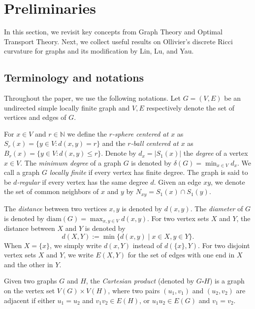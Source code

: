 \documentclass[10pt,a4paper]{article}
\theoremstyle{definition}
\theoremstyle{definition}
\theoremstyle{nonumber}
\begin{document}
\section{Preliminaries}

In this section, we revisit key concepts from Graph Theory and Optimal Transport Theory.
Next, we collect useful results on Ollivier's discrete Ricci curvature for graphs and its modification by Lin, Lu, and Yau.

\subsection{Terminology and  notations}
Throughout the paper, we use the following notations. 
Let $G = (V, E)$ be an undirected simple locally finite graph and $V, E$ respectively denote the set of vertices and edges of $G$.

For $x \in V$ and $r \in \mathbb{N}$ we define the \textit{$r$-sphere centered at $x$} as $S_r(x) = \{y \in V : d(x,y) = r\}$ and the \textit{$r$-ball centered at $x$} as $B_r(x) = \{y \in V : d(x,y) \leq r\}$. Denote by $d_x = |S_1(x)|$ the \textit{degree} of a vertex $x \in V$. The \textit{minimum degree} of a graph $G$ is denoted by $\delta(G) = \min_{x \in V} d_x$. We call a graph $G$ \textit{locally finite} if every vertex has finite degree. The graph is said to be \textit{$d$-regular} if every vertex has the same degree $d$.
Given an edge $xy$, we denote the set of common neighbors of $x$ and $y$ by $N_{xy} = S_1(x) \cap S_1(y)$.

The \textit{distance} between two vertices $x, y$ is denoted by $d(x, y)$. 
The \textit{diameter} of $G$ is denoted by $\mathrm{diam}(G) = \max_{x,y \in V} d(x,y)$.
For two vertex sets $X$ and $Y$, the distance between $X$ and $Y$ is denoted by
$$d(X, Y) := \min \{ d(x, y) \mid x \in X, y \in Y \}.$$
When $X = \{x\}$, we simply write $d(x, Y)$ instead of $d(\{x\}, Y)$. 
For two disjoint vertex sets $X$ and $Y$, we write $E(X, Y)$ for the set of edges with one end in $X$ and the other in $Y$.

Given two graphs $G$ and $H$, the \textit{Cartesian product} (denoted by $G \square H$) is a graph on the vertex set $V(G) \times V(H)$, where two pairs $(u_1, v_1)$ and $(u_2, v_2)$ are adjacent if either $u_1 = u_2$ and $v_1v_2 \in E(H)$, or $u_1u_2 \in E(G)$ and $v_1 = v_2$. 
\end{document}
